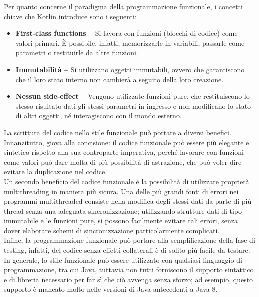 Per quanto concerne il paradigma della programmazione funzionale, i concetti chiave che Kotlin introduce sono i seguenti:
\begin{itemize}
  \item {\bfseries First-class functions –} Si lavora con funzioni (blocchi di codice) come valori primari.
        È possibile, infatti, memorizzarle in variabili, passarle come parametri o restituirle da altre funzioni.
  \item {\bfseries Immutabilità –} Si utilizzano oggetti immutabili, ovvero che garantiscono che il loro stato
        interno non cambierà a seguito della loro creazione.
  \item {\bfseries Nessun side-effect –} Vengono utilizzate funzioni pure, che restituiscono
        lo stesso risultato dati gli stessi parametri in ingresso e non modificano lo stato di altri oggetti,
        né interagiscono con il mondo esterno.
\end{itemize}
La scrittura del codice nello stile funzionale può portare a diversi benefici.\\
Innanzitutto, giova alla concisione: il codice funzionale può essere più elegante
e sintetico rispetto alla sua controparte imperativa, perché lavorare con funzioni come valori può dare molta di più possibilità di astrazione, che può voler dire evitare la duplicazione nel codice. \\
Un secondo beneficio del codice funzionale è la possibilità di utilizzare proprietà multithreading
in maniera più sicura. Una delle più grandi fonti di errori nei programmi multithreaded consiste
nella modifica degli stessi dati da parte di più thread senza una adeguata sincronizzazione;
utilizzando strutture dati di tipo immutabile e le funzioni pure, si possono facilmente evitare tali errori,
senza dover elaborare schemi di sincronizzazione particolarmente complicati. \\
Infine, la programmazione funzionale può portare alla semplificazione della fase di testing,
infatti, del codice senza effetti collaterali è di solito più facile da testare. \\
In generale, lo stile funzionale può essere utilizzato con qualsiasi linguaggio di programmazione,
tra cui Java, tuttavia non tutti forniscono il supporto sintattico e di libreria
necessario per far sì che ciò avvenga senza sforzo; ad esempio, questo supporto è mancato molto
nelle versioni di Java antecedenti a Java 8. \\


